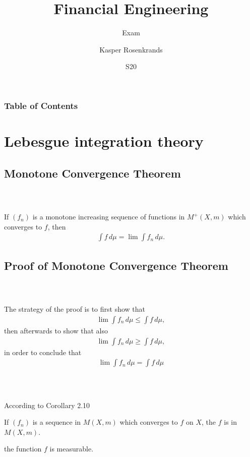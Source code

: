\documentclass{beamer}
\title{Financial Engineering}
\subtitle{Exam}
\author{Kasper Rosenkrands}
\institute{Aalborg University}
\date{S20}
\numberwithin{equation}{section}
\begin{document}
\frame{\titlepage}

\begin{frame}
\frametitle{Table of Contents}
\tableofcontents[hideallsubsections]
\end{frame}

\section{Lebesgue integration theory}

\subsection{Monotone Convergence Theorem}

\begin{frame}\frametitle{{\normalsize \secname} \\ {\large \subsecname}}
    \begin{theorem}
        If $(f_n)$ is a monotone increasing sequence of functions in $M^+(X,m)$ which converges to $f$, then
        \begin{align}\label{eq:b4.6}
            \int f \,d\mu = \lim \int f_n  \,d\mu. 
        \end{align}
    \end{theorem}
\end{frame}

\subsection{Proof of Monotone Convergence Theorem}

\begin{frame}\frametitle{{\normalsize \secname} \\ {\large \subsecname}}
    The strategy of the proof is to first show that
    \begin{align}
        \lim \int f_n \, d\mu \leq \int f \, d\mu,
    \end{align}
    then afterwards to show that also
    \begin{align}
        \lim \int f_n \, d\mu \geq \int f \, d\mu,
    \end{align}
    in order to conclude that
    \begin{align}
        \lim \int f_n \, d\mu = \int f \, d\mu
    \end{align}
\end{frame}

\begin{frame}\frametitle{{\normalsize \secname} \\ {\large \subsecname}}
    According to Corollary 2.10
    \begin{corollary}
        If $(f_n)$ is a sequence in $M(X,m)$ which converges to $f$ on $X$, the $f$ is in $M(X,m)$.
    \end{corollary}
    the function $f$ is measurable.
\end{frame}
\end{document}
